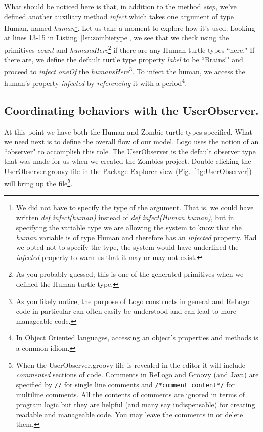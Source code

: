 \documentclass[11pt]{amsart}
\begin{document}
What should be noticed here is that, in addition to the method \emph{step}, we've defined another auxiliary method \emph{infect} which takes one argument of type Human, named \emph{human}\footnote{We did not have to specify the type of the argument. That is, we could have written \emph{def infect(human)} instead of \emph{def infect(Human human)}, but in specifying the variable type we are allowing the system to know that the \emph{human} variable is of type Human and therefore has an \emph{infected} property. Had we opted not to specify the type, the system would have underlined the \emph{infected} property to warn us that it may or may not exist.}. Let us take a moment to explore how it's used. Looking at lines 13-15 in Listing~\ref{lst:zombietype}, we see that we check using the primitives \emph{count} and \emph{humansHere}\footnote{As you probably guessed, this is one of the generated primitives when we defined the Human turtle type.} if there are any Human turtle types ``here." If there are, we define the default turtle type property \emph{label} to be ``Brains!" and proceed to \emph{infect} \emph{oneOf} the \emph{humansHere}\footnote{As you likely notice, the purpose of Logo constructs in general and ReLogo code in particular can often easily be understood and can lead to more manageable code.}. To infect the human, we access the human's property \emph{infected} by \emph{referencing} it with a period\footnote{In Object Oriented languages, accessing an object's properties and methods is a common idiom.}.

\subsection{Coordinating behaviors with the UserObserver.}
At this point we have both the Human and Zombie turtle types specified. What we need next is to define the overall flow of our model. Logo uses the notion of an ``observer" to accomplish this role. The UserObserver is the default observer type that was made for us when we created the Zombies project. Double clicking the UserObserver.groovy file in the Package Explorer view (Fig.~\ref{fig:UserObserver}) will bring up the file\footnote{When the UserObserver.groovy file is revealed in the editor it will include \emph{commented} sections of code. Comments in ReLogo and Groovy (and Java) are specified by \texttt{//} for single line comments and \texttt{/*comment content*/} for multiline comments. All the contents of comments are ignored in terms of program logic but they are helpful (and many say indispensable) for creating readable and manageable code. You may leave the comments in or delete them.}.
\end{document}
